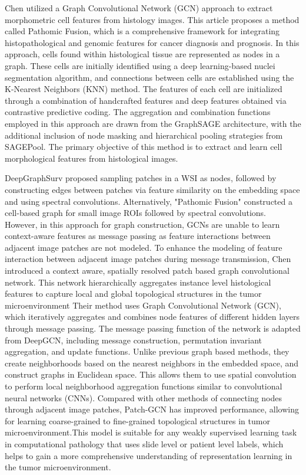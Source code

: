\documentclass[journal,twoside,web]{ieeecolor}
\begin{document}
Chen\cite{chen2020pathomic} utilized a Graph Convolutional Network (GCN) approach to extract morphometric cell features from histology images. This article proposes a method called Pathomic Fusion, which is a comprehensive framework for integrating histopathological and genomic features for cancer diagnosis and prognosis. In this approach, cells found within histological tissue are represented as nodes in a graph. These cells are initially identified using a deep learning-based nuclei segmentation algorithm, and connections between cells are established using the K-Nearest Neighbors (KNN) method. The features of each cell are initialized through a combination of handcrafted features and deep features obtained via contrastive predictive coding. The aggregation and combination functions employed in this approach are drawn from the GraphSAGE architecture, with the additional inclusion of node masking and hierarchical pooling strategies from SAGEPool. The primary objective of this method is to extract and learn cell morphological features from histological images.


DeepGraphSurv proposed sampling patches in a WSI as nodes, followed by constructing edges between patches via feature similarity on the embedding space and using spectral convolutions. Alternatively, "Pathomic Fusion" constructed a cell-based graph for small image ROIs followed by spectral convolutions. However, in this approach for graph construction, GCNs are unable to learn context-aware features as message passing as feature interactions between adjacent image patches are not modeled.
To enhance the modeling of feature interaction between adjacent image patches during message transmission, Chen \cite{chen2021whole} introduced a context aware, spatially resolved patch based graph convolutional network. This network hierarchically aggregates instance level histological features to capture local and global topological structures in the tumor microenvironment
Their method uses Graph Convolutional Network (GCN), which iteratively aggregates and combines node features of different hidden layers through message passing. The message passing function of the network is adapted from DeepGCN\cite{li2019deepgcns}, including message construction, permutation invariant aggregation, and update functions. Unlike previous graph based methods, they create neighborhoods based on the nearest neighbors in the embedded space, and construct graphs in Euclidean space. This allows them to use spatial convolution to perform local neighborhood aggregation functions similar to convolutional neural networks (CNNs). Compared with other methods of connecting nodes through adjacent image patches, Patch-GCN has improved performance, allowing for learning coarse-grained to fine-grained topological structures in tumor microenvironment.This model is suitable for any weakly supervised learning task in computational pathology that uses slide level or patient level labels, which helps to gain a more comprehensive understanding of representation learning in the tumor microenvironment.
\end{document}
